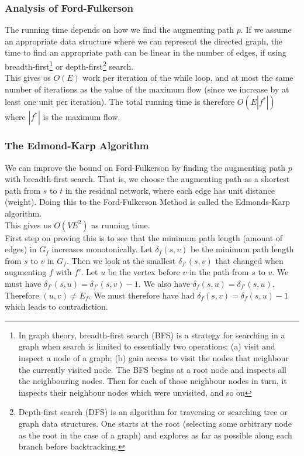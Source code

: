 \subsubsection{Analysis of Ford-Fulkerson}
The running time depends on how we find the augmenting path $p$. If we assume an appropriate data structure where we can represent the directed graph, the time to find an appropriate path can be linear in the number of edges, if using breadth-first\footnote{In graph theory, breadth-first search (BFS) is a strategy for searching in a graph when search is limited to essentially two operations: (a) visit and inspect a node of a graph; (b) gain access to visit the nodes that neighbour the currently visited node. The BFS begins at a root node and inspects all the neighbouring nodes. Then for each of those neighbour nodes in turn, it inspects their neighbour nodes which were unvisited, and so on} or depth-first\footnote{Depth-first search (DFS) is an algorithm for traversing or searching tree or graph data structures. One starts at the root (selecting some arbitrary node as the root in the case of a graph) and explores as far as possible along each branch before backtracking.} search. \\

This gives os $O(E)$ work per iteration of the while loop, and at most the same number of iterations as the value of the maximum flow (since we increase by at least one unit per iteration). The total running time is therefore $O(E |f^*|)$ where $|f^*|$ is the maximum flow. 
%
\subsubsection{The Edmond-Karp Algorithm}
We can improve the bound on Ford-Fulkerson by finding the augmenting path $p$ with breadth-first search. That is, we choose the augmenting path as a shortest path from $s$ to $t$ in the residual network, where each edge has unit distance (weight). Doing this to the Ford-Fulkerson Method is called the Edmonds-Karp algorithm. \\

This gives us $O(VE^2)$ as running time. \\

First step on proving this is to see that the minimum path length (amount of edges) in $G_f$ increases monotonically. Let $\delta_f(s, v)$ be the minimum path length from $s$ to $v$ in $G_f$. Then we look at the smallest $\delta_{f'}(s, v)$ that changed when augmenting $f$ with $f'$. Let $u$ be the vertex before $v$ in the path from $s$ to $v$. We must have $\delta_{f'}(s, u) = \delta_{f'}(s, v) - 1$. We also have $\delta_f(s, u) = \delta_{f'}(s, u)$. Therefore $(u, v) \neq E_f$. We must therefore have had $\delta_f(s, v) = \delta_f(s, u) - 1$ which leads to contradiction. \\

